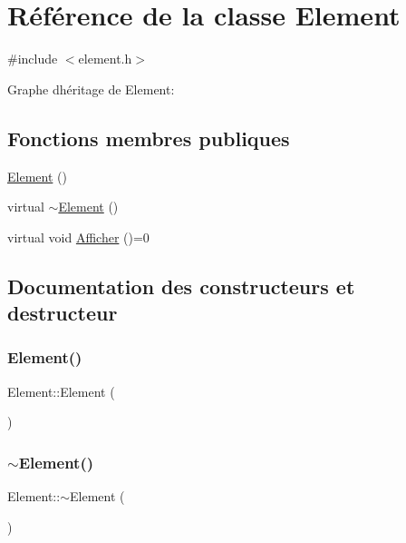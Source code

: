 \hypertarget{class_element}{}\section{Référence de la classe Element}
\label{class_element}


{\ttfamily \#include $<$element.\+h$>$}



Graphe d\textquotesingle{}héritage de Element\+:
\subsection*{Fonctions membres publiques}
\begin{DoxyCompactItemize}
\item 
\hyperlink{class_element_ab0d0e20be9a36ae676202db753faeec9}{Element} ()
\item 
virtual \hyperlink{class_element_a13d54ba9c08b6bec651402f1c2bb002c}{$\sim$\+Element} ()
\item 
virtual void \hyperlink{class_element_aa6fe26841512814e1e838c14c692daf0}{Afficher} ()=0
\end{DoxyCompactItemize}


\subsection{Documentation des constructeurs et destructeur}
\mbox{\label{class_element_ab0d0e20be9a36ae676202db753faeec9}} 
\subsubsection{\texorpdfstring{Element()}{Element()}}
{\footnotesize\ttfamily Element\+::\+Element (\begin{DoxyParamCaption}{ }\end{DoxyParamCaption})}

\mbox{\label{class_element_a13d54ba9c08b6bec651402f1c2bb002c}} 
\subsubsection{\texorpdfstring{$\sim$\+Element()}{~Element()}}
{\footnotesize\ttfamily Element\+::$\sim$\+Element (\begin{DoxyParamCaption}{ }\end{DoxyParamCaption})\hspace{0.3cm}{\ttfamily [virtual]}}



